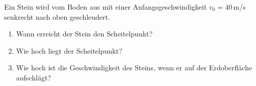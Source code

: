 \begin{ExerciseBlock}
Ein Stein wird vom Boden aus mit einer Anfangsgeschwindigkeit $v_0 = 40 \,$m/s senkrecht nach oben geschleudert.

\begin{enumerate}
	\item Wann erreicht der Stein den Scheitelpunkt?

	\item Wie hoch liegt der Scheitelpunkt?

	\item Wie hoch ist die Geschwindigkeit des Steins, wenn er auf der Erdoberfläche aufschlägt?

\end{enumerate}
\end{ExerciseBlock}
